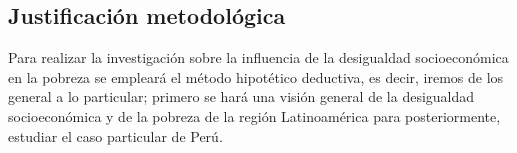 \subsection{Justificación metodológica}


Para realizar la investigación sobre la influencia de la desigualdad socioeconómica en la pobreza se empleará el método hipotético deductiva, es decir, iremos de los general a lo particular; primero se hará una visión general de la desigualdad socioeconómica y de la pobreza de la región Latinoamérica para posteriormente, estudiar el caso particular de Perú.











